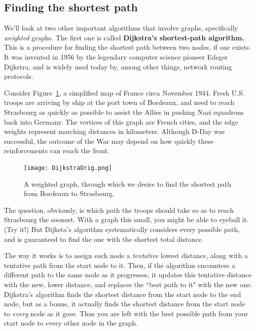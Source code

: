 \subsection{Finding the shortest path}

We'll look at two other important algorithms that involve graphs,
specifically \textit{weighted} graphs. The first one is called
\textbf{Dijkstra's shortest-path algorithm.} This is a procedure for
finding the shortest path between two nodes, if one exists. It was invented
in 1956 by the legendary computer science pioneer Edsger Dijkstra, and is
widely used today by, among other things, network routing protocols.

Consider Figure~\ref{france}, a simplified map of France circa November
1944. Fresh U.S. troops are arriving by ship at the port town of Bordeaux,
and need to reach Strasbourg as quickly as possible to assist the Allies in
pushing Nazi squadrons back into Germany. The vertices of this graph are
French cities, and the edge weights represent marching distances in
kilometers. Although D-Day was successful, the outcome of the War may
depend on how quickly these reinforcements can reach the front.

\begin{figure}[ht]
\centering
\texttt{[image: DijkstraOrig.png]}
\caption{A weighted graph, through which we desire to find the shortest
path from Bordeaux to Strasbourg.}
\label{france}
\end{figure}

The question, obviously, is which path the troops should take so as to
reach Strasbourg the soonest. With a graph this small, you might be able to
eyeball it. (Try it!) But Dijksta's algorithm systematically considers
every possible path, and is guaranteed to find the one with the shortest
total distance.

The way it works is to assign each node a \textit{tentative} lowest
distance, along with a tentative path from the start node to it. Then, if
the algorithm encounters a different path to the same node as it
progresses, it updates this tentative distance with the new, lower
distance, and replaces the ``best path to it" with the new one. Dijkstra's
algorithm finds the shortest distance from the start node to the end node,
but as a bonus, it actually finds the shortest distance from the start node
to \textit{every} node as it goes. Thus you are left with the best possible
path from your start node to every other node in the graph.

